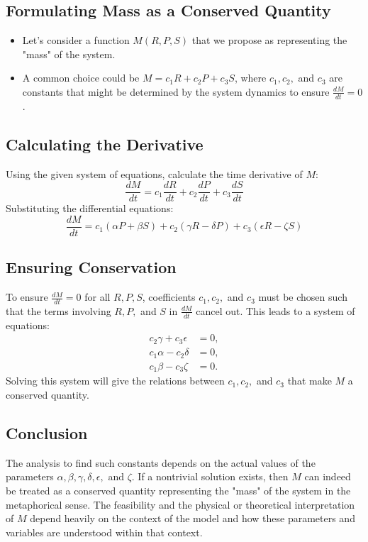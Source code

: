 \documentclass{article}
\begin{document}
\subsection*{Formulating Mass as a Conserved Quantity}
\begin{itemize}
  \item Let's consider a function \( M(R, P, S) \) that we propose as representing the "mass" of the system.
  \item A common choice could be \( M = c_1 R + c_2 P + c_3 S \), where \( c_1, c_2, \) and \( c_3 \) are constants that might be determined by the system dynamics to ensure \( \frac{dM}{dt} = 0 \).
\end{itemize}

\subsection*{Calculating the Derivative}
Using the given system of equations, calculate the time derivative of \( M \):
\[
\frac{dM}{dt} = c_1 \frac{dR}{dt} + c_2 \frac{dP}{dt} + c_3 \frac{dS}{dt}
\]
Substituting the differential equations:
\[
\frac{dM}{dt} = c_1 (\alpha P + \beta S) + c_2 (\gamma R - \delta P) + c_3 (\epsilon R - \zeta S)
\]

\subsection*{Ensuring Conservation}
To ensure \( \frac{dM}{dt} = 0 \) for all \( R, P, S \), coefficients \( c_1, c_2, \) and \( c_3 \) must be chosen such that the terms involving \( R, P, \) and \( S \) in \( \frac{dM}{dt} \) cancel out. This leads to a system of equations:
\[
\begin{align*}
c_2 \gamma + c_3 \epsilon &= 0, \\
c_1 \alpha - c_2 \delta &= 0, \\
c_1 \beta - c_3 \zeta &= 0.
\end{align*}
\]
Solving this system will give the relations between \( c_1, c_2, \) and \( c_3 \) that make \( M \) a conserved quantity.

\subsection*{Conclusion}

The analysis to find such constants depends on the actual values of the parameters \( \alpha, \beta, \gamma, \delta, \epsilon, \) and \( \zeta \). If a nontrivial solution exists, then \( M \) can indeed be treated as a conserved quantity representing the "mass" of the system in the metaphorical sense. The feasibility and the physical or theoretical interpretation of \( M \) depend heavily on the context of the model and how these parameters and variables are understood within that context.
\end{document}
